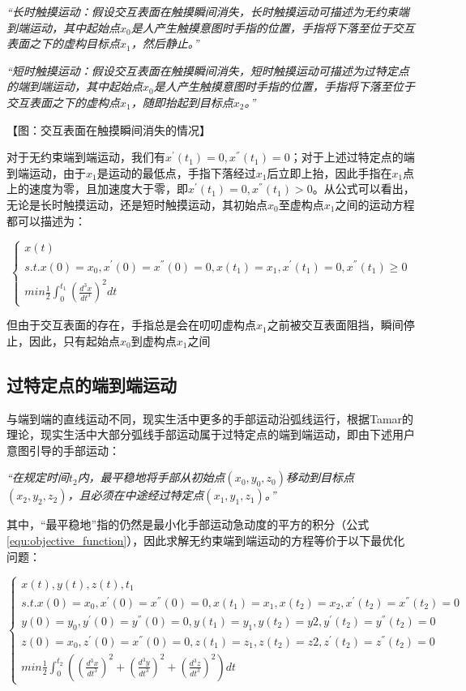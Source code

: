 \emph{“长时触摸运动：假设交互表面在触摸瞬间消失，长时触摸运动可描述为无约束端到端运动，其中起始点$x_0$是人产生触摸意图时手指的位置，手指将下落至位于交互表面之下的虚构目标点$x_1$，然后静止。”}

\emph{“短时触摸运动：假设交互表面在触摸瞬间消失，短时触摸运动可描述为过特定点的端到端运动，其中起始点$x_0$是人产生触摸意图时手指的位置，手指将下落至位于交互表面之下的虚构点$x_1$，随即抬起到目标点$x_2$。”}

【图：交互表面在触摸瞬间消失的情况】

对于无约束端到端运动，我们有$x^{'}(t_1)=0,x^{''}(t_1)=0$；对于上述过特定点的端到端运动，由于$x_1$是运动的最低点，手指下落经过$x_1$后立即上抬，因此手指在$x_1$点上的速度为零，且加速度大于零，即$x^{'}(t_1)=0,x^{''}(t_1)>0$。从公式可以看出，无论是长时触摸运动，还是短时触摸运动，其初始点$x_0$至虚构点$x_1$之间的运动方程都可以描述为：

\begin{equation}
	\begin{cases}
		x(t) \\
		s.t. x(0)=x_0,x^{'}(0)=x^{''}(0)=0,x(t_1)=x_1,x^{'}(t_1)=0,x^{''}(t_1)\geq0 \\
		min\frac{1}{2}\int_{0}^{t_1}\left(\frac{d^3x}{dt^3}\right)^2 dt
	\end{cases}
\end{equation}

但由于交互表面的存在，手指总是会在叨叨虚构点$x_1$之前被交互表面阻挡，瞬间停止，因此，只有起始点$x_0$到虚构点$x_1$之间

\subsection{过特定点的端到端运动}

与端到端的直线运动不同，现实生活中更多的手部运动沿弧线运行，根据Tamar的理论，现实生活中大部分弧线手部运动属于过特定点的端到端运动，即由下述用户意图引导的手部运动：

\emph{“在规定时间$t_2$内，最平稳地将手部从初始点$(x_0, y_0, z_0)$移动到目标点$(x_2, y_2, z_2)$，且必须在中途经过特定点$(x_1, y_1, z_1)$。”}

其中，“最平稳地”指的仍然是最小化手部运动急动度的平方的积分（公式\ref{equ:objective_function}），因此求解无约束端到端运动的方程等价于以下最优化问题：

\begin{equation}
	\begin{cases}
		x(t),y(t),z(t),t_1 \\
		s.t. x(0)=x_0,x^{'}(0)=x^{''}(0)=0,x(t_1)=x_1,x(t_2)=x_2,x^{'}(t_2)=x^{''}(t_2)=0 \\
		y(0)=y_0,y^{'}(0)=y^{''}(0)=0,y(t_1)=y_1,y(t_2)=y2,y^{'}(t_2)=y^{''}(t_2)=0 \\
		z(0)=x_0,z^{'}(0)=x^{''}(0)=0,z(t_1)=z_1,z(t_2)=z2,z^{'}(t_2)=z^{''}(t_2)=0 \\
		min\frac{1}{2}\int_{0}^{t_2}\left(\left(\frac{d^3x}{dt^3}\right)^2+\left(\frac{d^3y}{dt^3}\right)^2+\left(\frac{d^3z}{dt^3}\right)^2\right)dt
	\end{cases}
\end{equation}

